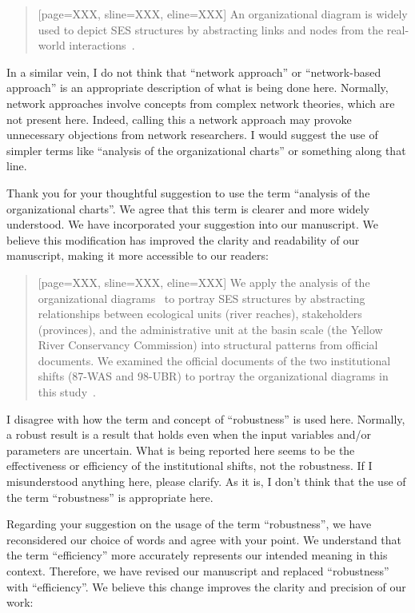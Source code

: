 \begin{quote}[page=XXX, sline=XXX, eline=XXX]
    An organizational diagram is widely used to depict SES structures by abstracting links and nodes from the real-world interactions~\cite{wang2022g,bodin2017a,kluger2020,guerrero2015}.
\end{quote}

\RC{} In a similar vein, I do not think that ``network approach'' or ``network-based approach'' is an appropriate description of what is being done here. Normally, network approaches involve concepts from complex network theories, which are not present here. Indeed, calling this a network approach may provoke unnecessary objections from network researchers. I would suggest the use of simpler terms like ``analysis of the organizational charts'' or something along that line.

\AR{} Thank you for your thoughtful suggestion to use the term ``analysis of the organizational charts''. We agree that this term is clearer and more widely understood. We have incorporated your suggestion into our manuscript. We believe this modification has improved the clarity and readability of our manuscript, making it more accessible to our readers:

\begin{quote}[page=XXX, sline=XXX, eline=XXX]
    We apply the analysis of the organizational diagrams~\cite{bodin2017b} to portray SES structures by abstracting relationships between ecological units (river reaches), stakeholders (provinces), and the administrative unit at the basin scale (the Yellow River Conservancy Commission) into structural patterns from official documents.
    We examined the official documents of the two institutional shifts (87-WAS and 98-UBR) to portray the organizational diagrams in this study~\cite{bodin2017a,kluger2020,guerrero2015}.
\end{quote}

\RC{} I disagree with how the term and concept of ``robustness'' is used here. Normally, a robust result is a result that holds even when the input variables and/or parameters are uncertain. What is being reported here seems to be the effectiveness or efficiency of the institutional shifts, not the robustness. If I misunderstood anything here, please clarify. As it is, I don't think that the use of the term ``robustness'' is appropriate here.

\AR{} Regarding your suggestion on the usage of the term ``robustness'', we have reconsidered our choice of words and agree with your point. We understand that the term ``efficiency'' more accurately represents our intended meaning in this context. Therefore, we have revised our manuscript and replaced ``robustness'' with ``efficiency''. We believe this change improves the clarity and precision of our work:

